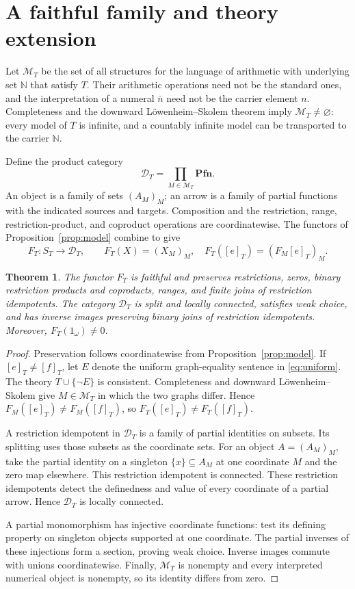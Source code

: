\documentclass[11pt]{article}
\newtheorem{theorem}{Theorem}[section]
\newcommand{\N}{\mathbb N}
\newcommand{\Pfn}{\mathbf{Pfn}}
\begin{document}
\section{A faithful family and theory extension}\label{sec:family}

Let $\mathcal M_T$ be the set of all structures for the language of
arithmetic with underlying set $\N$ that satisfy $T$. Their arithmetic
operations need not be the standard ones, and the interpretation of a
numeral $\bar n$ need not be the carrier element $n$. Completeness and
the downward L\"owenheim--Skolem theorem imply
$\mathcal M_T\ne\varnothing$: every model of $T$ is infinite, and a
countably infinite model can be transported to the carrier $\N$.

Define the product category
\[
 \mathcal D_T=\prod_{M\in\mathcal M_T}\Pfn.
\]
An object is a family of sets $(A_M)_M$; an arrow is a family of partial
functions with the indicated sources and targets. Composition and the
restriction, range, restriction-product, and coproduct operations are coordinatewise.
The functors of Proposition~\ref{prop:model} combine to give
\[
 F_T:S_T\longrightarrow\mathcal D_T,\qquad
 F_T(X)=(X_M)_M,\quad F_T([e]_T)=(F_M[e]_T)_M.
\]

\begin{theorem}\label{thm:faithful}
The functor $F_T$ is faithful and preserves restrictions, zeros, binary
restriction products and coproducts, ranges, and finite joins of
restriction idempotents. The category
$\mathcal D_T$ is split and locally connected, satisfies weak choice,
and has inverse images preserving binary joins of restriction
idempotents. Moreover,
$F_T(1_\omega)\ne0$.
\end{theorem}
\begin{proof}
Preservation follows coordinatewise from Proposition~\ref{prop:model}.
If $[e]_T\ne[f]_T$, let $E$ denote the uniform graph-equality sentence
in \eqref{eq:uniform}. The theory $T\cup\{\neg E\}$ is consistent.
Completeness and downward L\"owenheim--Skolem give
$M\in\mathcal M_T$ in which the two graphs differ. Hence
$F_M([e]_T)\ne F_M([f]_T)$, so $F_T([e]_T)\ne F_T([f]_T)$.

A restriction idempotent in $\mathcal D_T$ is a family of partial
identities on subsets. Its splitting uses those subsets as the
coordinate sets. For an object $A=(A_M)_M$, take the partial identity
on a singleton $\{x\}\subseteq A_M$ at one coordinate $M$ and the zero
map elsewhere. This restriction idempotent is connected. These
restriction idempotents detect the definedness and value of every coordinate of a partial arrow. Hence
$\mathcal D_T$ is locally connected.

A partial monomorphism has injective coordinate functions: test its
defining property on singleton objects supported at one coordinate.
The partial inverses of these injections form a section, proving weak
choice. Inverse images commute with unions coordinatewise. Finally,
$\mathcal M_T$ is nonempty and every interpreted numerical object is
nonempty, so its identity differs from zero.
\end{proof}
\end{document}
